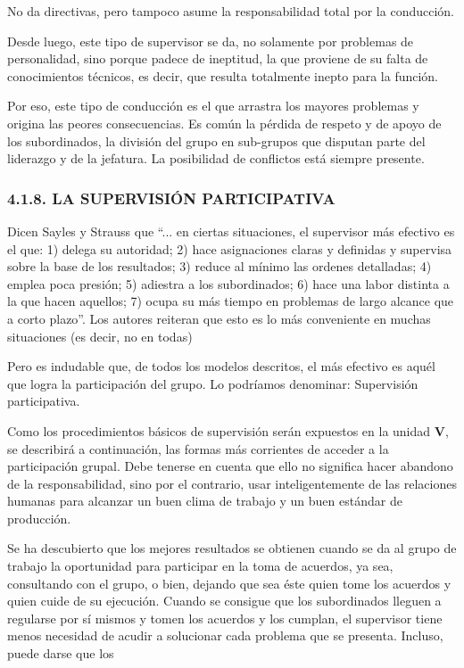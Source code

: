 
No da directivas, pero tampoco asume la responsabilidad total por la conducción.

Desde luego, este tipo de supervisor se da, no solamente por problemas de personalidad, sino porque padece de ineptitud, la que proviene de su falta de conocimientos técnicos, es decir, que resulta totalmente inepto para la función.

Por eso, este tipo de conducción es el que arrastra los mayores problemas y origina las peores consecuencias. Es común la pérdida de respeto y de apoyo de los subordinados, la división del grupo en sub-grupos que disputan parte del liderazgo y de la jefatura. La posibilidad de conflictos está siempre presente.

\subsubsection*{4.1.8. LA SUPERVISIÓN PARTICIPATIVA}
Dicen Sayles y Strauss que “... en ciertas situaciones, el supervisor más efectivo es el que: 1) delega su autoridad; 2) hace asignaciones claras y definidas y supervisa sobre la base de los resultados; 3) reduce al mínimo las ordenes detalladas; 4) emplea poca presión; 5) adiestra a los subordinados; 6) hace una labor distinta a la que hacen aquellos; 7) ocupa su más tiempo en problemas de largo alcance que a corto plazo”. Los autores reiteran que esto es lo más conveniente en muchas situaciones (es decir, no en todas)

Pero es indudable que, de todos los modelos descritos, el más efectivo es aquél que logra la participación del grupo. Lo podríamos denominar: Supervisión participativa.

Como los procedimientos básicos de supervisión serán expuestos en la unidad \textbf{V}, se describirá a continuación, las formas más corrientes de acceder a la participación grupal. Debe tenerse en cuenta que ello no significa hacer abandono de la responsabilidad, sino por el contrario, usar inteligentemente de las relaciones humanas para alcanzar un buen clima de trabajo y un buen estándar de producción.

Se ha descubierto que los mejores resultados se obtienen cuando se da al grupo de trabajo la oportunidad para participar en la toma de acuerdos, ya sea, consultando con el grupo, o bien, dejando que sea éste quien tome los acuerdos y quien cuide de su ejecución. Cuando se consigue que los subordinados lleguen a regularse por sí mismos y tomen los acuerdos y los cumplan, el supervisor tiene menos necesidad de acudir a solucionar cada problema que se presenta. Incluso, puede darse que los



